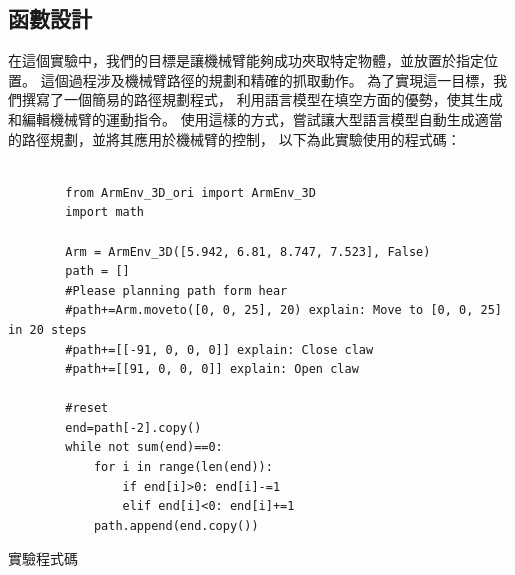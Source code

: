 \documentclass[class=NCU_thesis, crop=false]{standalone}
\begin{document}
\subsection{函數設計}
在這個實驗中，我們的目標是讓機械臂能夠成功夾取特定物體，並放置於指定位置。
這個過程涉及機械臂路徑的規劃和精確的抓取動作。
為了實現這一目標，我們撰寫了一個簡易的路徑規劃程式，
利用語言模型在填空方面的優勢，使其生成和編輯機械臂的運動指令。
使用這樣的方式，嘗試讓大型語言模型自動生成適當的路徑規劃，並將其應用於機械臂的控制，
以下為此實驗使用的程式碼：

\begin{listing}
    \begin{verbatim}

        from ArmEnv_3D_ori import ArmEnv_3D
        import math

        Arm = ArmEnv_3D([5.942, 6.81, 8.747, 7.523], False)
        path = []
        #Please planning path form hear
        #path+=Arm.moveto([0, 0, 25], 20) explain: Move to [0, 0, 25] in 20 steps
        #path+=[[-91, 0, 0, 0]] explain: Close claw
        #path+=[[91, 0, 0, 0]] explain: Open claw

        #reset
        end=path[-2].copy()
        while not sum(end)==0:
            for i in range(len(end)):
                if end[i]>0: end[i]-=1
                elif end[i]<0: end[i]+=1
            path.append(end.copy())

    \end{verbatim}
\caption{實驗程式碼} 
\end{listing}
\end{document}

